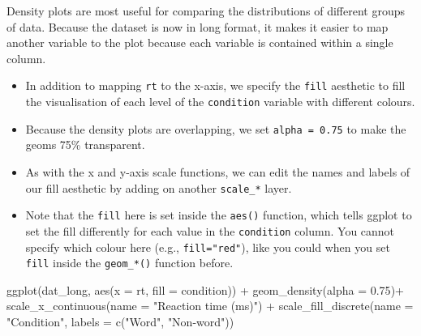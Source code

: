 \documentclass[
  english,
  doc,floatsintext]{apa6}
\newenvironment{Shaded}{\begin{snugshade}}{\end{snugshade}}
\newcommand{\AttributeTok}[1]{\textcolor[rgb]{0.77,0.63,0.00}{#1}}
\newcommand{\FloatTok}[1]{\textcolor[rgb]{0.00,0.00,0.81}{#1}}
\newcommand{\FunctionTok}[1]{\textcolor[rgb]{0.00,0.00,0.00}{#1}}
\newcommand{\NormalTok}[1]{#1}
\newcommand{\SpecialCharTok}[1]{\textcolor[rgb]{0.00,0.00,0.00}{#1}}
\newcommand{\StringTok}[1]{\textcolor[rgb]{0.31,0.60,0.02}{#1}}
\providecommand{\tightlist}{%
  \setlength{\itemsep}{0pt}\setlength{\parskip}{0pt}}
\begin{document}
Density plots are most useful for comparing the distributions of different groups of data. Because the dataset is now in long format, it makes it easier to map another variable to the plot because each variable is contained within a single column.

\begin{itemize}
\tightlist
\item
  In addition to mapping \texttt{rt} to the x-axis, we specify the \texttt{fill} aesthetic to fill the visualisation of each level of the \texttt{condition} variable with different colours.
\item
  Because the density plots are overlapping, we set \texttt{alpha\ =\ 0.75} to make the geoms 75\% transparent.
\item
  As with the x and y-axis scale functions, we can edit the names and labels of our fill aesthetic by adding on another \texttt{scale\_*} layer.
\item
  Note that the \texttt{fill} here is set inside the \texttt{aes()} function, which tells ggplot to set the fill differently for each value in the \texttt{condition} column. You cannot specify which colour here (e.g., \texttt{fill="red"}), like you could when you set \texttt{fill} inside the \texttt{geom\_*()} function before.
\end{itemize}

\begin{Shaded}
\begin{Highlighting}[]
\FunctionTok{ggplot}\NormalTok{(dat\_long, }\FunctionTok{aes}\NormalTok{(}\AttributeTok{x =}\NormalTok{ rt, }\AttributeTok{fill =}\NormalTok{ condition)) }\SpecialCharTok{+}
  \FunctionTok{geom\_density}\NormalTok{(}\AttributeTok{alpha =} \FloatTok{0.75}\NormalTok{)}\SpecialCharTok{+}
  \FunctionTok{scale\_x\_continuous}\NormalTok{(}\AttributeTok{name =} \StringTok{"Reaction time (ms)"}\NormalTok{) }\SpecialCharTok{+}
  \FunctionTok{scale\_fill\_discrete}\NormalTok{(}\AttributeTok{name =} \StringTok{"Condition"}\NormalTok{,}
                      \AttributeTok{labels =} \FunctionTok{c}\NormalTok{(}\StringTok{"Word"}\NormalTok{, }\StringTok{"Non{-}word"}\NormalTok{))}
\end{Highlighting}
\end{Shaded}
\end{document}
